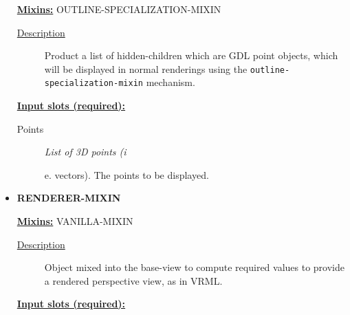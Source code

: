 \documentclass [11pt]{book}
\begin{document}
\begin{itemize}
\textbf{
\underline{Mixins:}} OUTLINE-SPECIALIZATION-MIXIN





\begin{description}

\item [
\underline{Description}]


Product a list of hidden-children which are GDL point objects, which 
will be displayed in normal renderings using the \texttt{outline-specialization-mixin} mechanism.



\end{description}








\textbf{
\underline{Input slots (required):}}

\begin{description}

\item [Points]
\emph{List of 3D points (i}

e. vectors). The points to be displayed.




\end{description}







\item {}
\label{prim:renderer-mixin}
\textbf{RENDERER-MIXIN}


\textbf{
\underline{Mixins:}} VANILLA-MIXIN





\begin{description}

\item [
\underline{Description}]


Object mixed into the base-view to compute required values to provide
a rendered perspective view, as in VRML.



\end{description}








\textbf{
\underline{Input slots (required):}}


\end{itemize}
\end{document}
